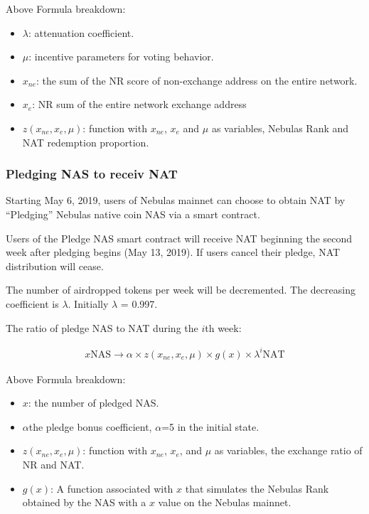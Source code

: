 Above Formula breakdown:

\begin{itemize}
	\item $\lambda$: attenuation coefficient.
	\item $\mu$: incentive parameters for voting behavior.
	\item $x_{ne}$: the sum of the NR score of non-exchange address on the entire network.
	\item $x_{e}$: NR sum of the entire network exchange address	
	\item $z(x_{ne},x_{e},\mu)$: function with $x_{ne}$, $x_{e}$ and $\mu$ as variables, Nebulas Rank and NAT redemption proportion.
\end{itemize}

\subsubsection{Pledging NAS to receiv NAT}

Starting May 6, 2019, users of Nebulas mainnet can choose to obtain NAT by “Pledging” Nebulas native coin NAS via a smart contract.

Users of the Pledge NAS smart contract will receive NAT beginning the second week after pledging begins (May 13, 2019). If users cancel their pledge, NAT distribution will cease.

The number of airdropped tokens per week will be decremented. The decreasing coefficient is $\lambda$. Initially $\lambda$ = 0.997.

The ratio of pledge NAS to NAT during the $i$th week:

\begin{align}
x \text{NAS} \rightarrow \alpha \times z(x_{ne},x_{e},\mu)\times g(x) \times \lambda^{i} \text{NAT}
\end{align}

Above Formula breakdown:

\begin{itemize}
	\item $x$: the number of pledged NAS.
	\item $\alpha$the pledge bonus coefficient, $\alpha$=5 in the initial state.
	\item $z(x_{ne},x_{e},\mu)$: function with $x_{ne}$, $x_{e}$, and $\mu$ as variables, the exchange ratio of NR and NAT.
	\item $g(x)$: A function associated with $x$ that simulates the Nebulas Rank obtained by the NAS with a $x$ value on the Nebulas mainnet.
\end{itemize}

